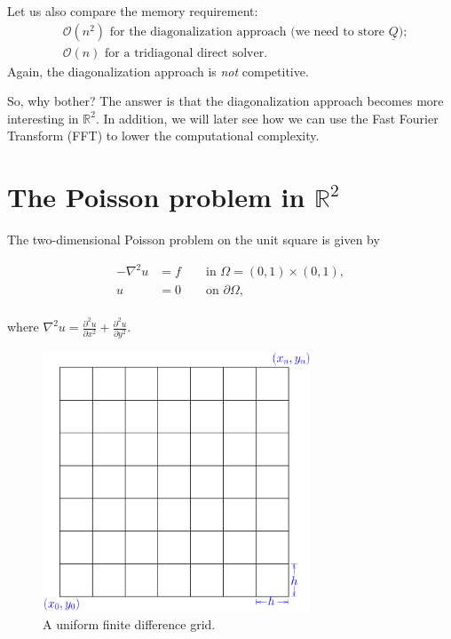 \documentclass[11pt]{article}
\begin{document}
Let us also compare the memory requirement:
\begin{align*}
  &\mathcal{O}(n^2) \text{ for the diagonalization approach 
  (we need to store $\underline{Q}$)}; \\
  &\mathcal{O}(n) \text{ for a tridiagonal direct solver}.
\end{align*}
Again, the diagonalization approach is {\em not} competitive.

So, why bother?  The answer is that the diagonalization approach becomes 
more interesting in $\mathbb{R}^2$. In addition, we will later see how we 
can use the Fast Fourier Transform (FFT) to lower the computational complexity. 



\section{The Poisson problem in $\mathbb{R}^2$}

The two-dimensional Poisson problem on the unit square is given by

\begin{equation}
  \begin{split}
    -\nabla^2 u &= f \qquad \text{in } \Omega=(0,1) \times (0,1), \\
    u &= 0 \qquad \text{on } \partial \Omega, \\
  \end{split}
  \label{eq:Poisson2D}
\end{equation}

where $\nabla^2 u = \frac{\partial^2 u}{\partial x^2} + \frac{\partial^2 u}{\partial y^2}$.


\begin{figure}[h]
  \centering
  \includegraphics[width=8cm]{FiniteDifferenceGrid}
    \caption{A uniform finite difference grid.}
  \label{fig:FDM_grid_2D}
\end{figure}
\end{document}
